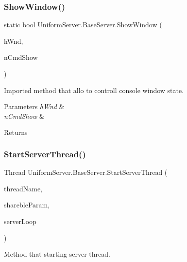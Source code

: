 \subsubsection{\texorpdfstring{Show\+Window()}{ShowWindow()}}
{\footnotesize\ttfamily static bool Uniform\+Server.\+Base\+Server.\+Show\+Window (\begin{DoxyParamCaption}\item[{Int\+Ptr}]{h\+Wnd,  }\item[{int}]{n\+Cmd\+Show }\end{DoxyParamCaption})\hspace{0.3cm}{\ttfamily [protected]}}



Imported method that allo to controll console window state. 


\begin{DoxyParams}{Parameters}
{\em h\+Wnd} & \\
\hline
{\em n\+Cmd\+Show} & \\
\hline
\end{DoxyParams}
\begin{DoxyReturn}{Returns}

\end{DoxyReturn}
\mbox{\label{class_uniform_server_1_1_base_server_aa4a1412b217944e7f8d6ccae6ac68289}} 
\subsubsection{\texorpdfstring{Start\+Server\+Thread()}{StartServerThread()}}
{\footnotesize\ttfamily Thread Uniform\+Server.\+Base\+Server.\+Start\+Server\+Thread (\begin{DoxyParamCaption}\item[{string}]{thread\+Name,  }\item[{object}]{shareble\+Param,  }\item[{Parameterized\+Thread\+Start}]{server\+Loop }\end{DoxyParamCaption})\hspace{0.3cm}{\ttfamily [protected]}}



Method that starting server thread. 


